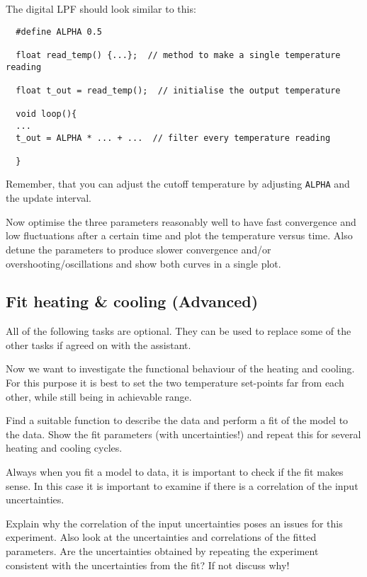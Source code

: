 %
The digital \ac{LPF} should look similar to this:
\begin{verbatim}
  #define ALPHA 0.5
  
  float read_temp() {...};  // method to make a single temperature reading
  
  float t_out = read_temp();  // initialise the output temperature
  
  void loop(){
  ...
  t_out = ALPHA * ... + ...  // filter every temperature reading
  
  }
\end{verbatim}
Remember, that you can adjust the cutoff temperature by adjusting \texttt{ALPHA} and the update interval.\par
%
\begin{task}
  Now optimise the three parameters reasonably well to have fast convergence and low fluctuations after a certain time and plot the temperature versus time. Also detune the parameters to produce slower convergence and/or overshooting/oscillations and show both curves in a single plot.
\end{task}
%
\subsection{Fit heating \& cooling (Advanced)}
%
\begin{note}
  All of the following tasks are optional. They can be used to replace some of the other tasks if agreed on with the assistant.
\end{note}
%
Now we want to investigate the functional behaviour of the heating and cooling. For this purpose it is best to set the two temperature set-points far from each other, while still being in achievable range.\par
%
\begin{atask}
  Find a suitable function to describe the data and perform a fit of the model to the data. Show the fit parameters (with uncertainties!) and repeat this for several heating and cooling cycles. 
\end{atask}
%
Always when you fit a model to data, it is important to check if the fit makes sense. In this case it is important to examine if there is a correlation of the input uncertainties.
%
\begin{atask}
  Explain why the correlation of the input uncertainties poses an issues for this experiment. Also look at the uncertainties and correlations of the fitted parameters. Are the uncertainties obtained by repeating the experiment consistent with the uncertainties from the fit? If not discuss why!
\end{atask}
%
